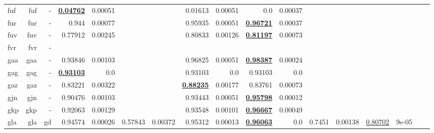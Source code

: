 \documentclass[11pt]{article}
\begin{document}
\begin{table*}[h]
{\begin{tabular}{lrrrrrrrrrrrrrrrr}
fuf         & fuf         & -         & \textbf{\underline{0.04762}}         & 0.00051         &          &          & 0.01613         & 0.00051         & 0.0         & 0.00037         &          &          &          &          \\
fur         & fur         & -         & 0.944         & 0.00077         &          &          & 0.95935         & 0.00051         & \textbf{\underline{0.96721}}         & 0.00037         &          &          &          &          \\
fuv         & fuv         & -         & 0.77912         & 0.00245         &          &          & 0.80833         & 0.00126         & \textbf{\underline{0.81197}}         & 0.00073         &          &          &          &          \\
fvr         & fvr         & -         &          &          &          &          &          &          &          &          &          &          &          &          \\
gaa         & gaa         & -         & 0.93846         & 0.00103         &          &          & 0.96825         & 0.00051         & \textbf{\underline{0.98387}}         & 0.00024         &          &          &          &          \\
gag         & gag         & -         & \textbf{\underline{0.93103}}         & 0.0         &          &          & 0.93103         & 0.0         & 0.93103         & 0.0         &          &          &          &          \\
gaz         & gaz         & -         & 0.83221         & 0.00322         &          &          & \textbf{\underline{0.88235}}         & 0.00177         & 0.83761         & 0.00073         &          &          &          &          \\
gjn         & gjn         & -         & 0.90476         & 0.00103         &          &          & 0.93443         & 0.00051         & \textbf{\underline{0.95798}}         & 0.00012         &          &          &          &          \\
gkp         & gkp         & -         & 0.92063         & 0.00129         &          &          & 0.93548         & 0.00101         & \textbf{\underline{0.96667}}         & 0.00049         &          &          &          &          \\
gla         & gla         & gd         & 0.94574         & 0.00026         & 0.57843         & 0.00372         & 0.95312         & 0.00013         & \textbf{\underline{0.96063}}         & 0.0         & 0.7451         & 0.00138         & \underline{0.80702}         & 9e-05         \\

\end{tabular}}
\end{table*}
\end{document}
